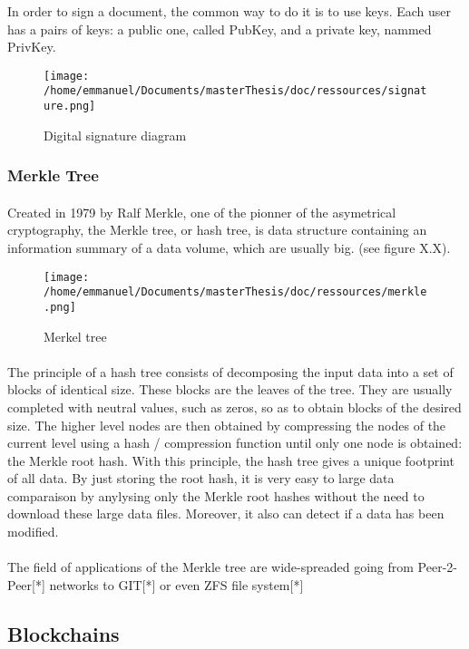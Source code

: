 In order to sign a document, the common way to do it is to use keys. Each user has a pairs of keys: a public one, called PubKey, and a private key, nammed PrivKey.
\begin{figure}[htp]
\centering
\texttt{[image: /home/emmanuel/Documents/masterThesis/doc/ressources/signature.png]}
\caption{Digital signature diagram}
\label{}
\end{figure}

\subsubsection{Merkle Tree}
\paragraph{}
Created in 1979 by Ralf Merkle, one of the pionner of the asymetrical cryptography, the Merkle tree, or hash tree, is data structure containing an information summary of a data volume, which are usually big. (see figure X.X).
\begin{figure}[h!]
\centering
\texttt{[image: /home/emmanuel/Documents/masterThesis/doc/ressources/merkle.png]}
\caption{Merkel tree}
\label{}
\end{figure}
\paragraph{}
The principle of a hash tree consists of decomposing the input data into a set of blocks of identical size. These blocks are the leaves of the tree. They are usually completed with neutral values, such as zeros, so as to obtain blocks of the desired size. The higher level nodes are then obtained by compressing the nodes of the current level using a hash / compression function until only one node is obtained: the Merkle root hash.
With this principle, the hash tree gives a unique footprint of all data. By just storing the root hash, it is very easy to large data comparaison by anylysing only the Merkle root hashes without the need to download these large data files. Moreover, it also can detect if a data has been modified. 
\paragraph{}
The field of applications of the Merkle tree are wide-spreaded going from Peer-2-Peer[*] networks to GIT[*] or even ZFS file system[*]

\subsection{Blockchains}
